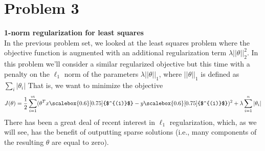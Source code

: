 \documentclass{article}
\title{Problem Set #3: Learning Theory and Unsupervised Learning}
\author{Eitan Joseph \and Caroline Wang}
\date{\today}
\newcommand{\supi}{\scalebox{0.6}[0.75]{$^{(i)}$}}
\begin{document}
\maketitle

\section*{Problem 3}
\textbf{1-norm regularization for least squares}\\
In the previous problem set, we looked at the least squares problem where the objective function is augmented with an additional regularization term $\lambda||\theta||_2^2$. In this problem we’ll consider a similar regularized objective but this time with a penalty on the $\ell_1$ norm of the parameters $\lambda||\theta||_1$, where $||\theta||_1$ is defined as $\sum_i|\theta_i|$ That is, we want to minimize the objective
\begin{align*}
    J(\theta) = \frac{1}{2}\sum_{i=1}^m(\theta^Tx\supi-y\supi)^2 + \lambda\sum_{i=1}^n|\theta_i|
\end{align*}
There has been a great deal of recent interest in $\ell_1$ regularization, which, as we will see, has the benefit of outputting sparse solutions (i.e., many components of the resulting $\theta$ are equal to zero).
\end{document}

